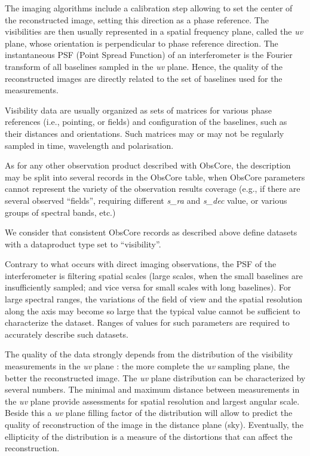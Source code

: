 \documentclass[11pt,a4paper]{ivoa}
\begin{document}
The imaging algorithms include a calibration step allowing to set the center of the
reconstructed image, setting this direction as a phase reference. The visibilities
are then usually represented in a spatial frequency plane, called the \emph{uv} plane,
whose orientation is perpendicular to phase reference direction. The instantaneous PSF
(Point Spread Function) of an interferometer is the Fourier transform of all baselines
sampled in the \emph{uv} plane. Hence, the quality of the reconstructed images are
directly related to the set of baselines used for the measurements.

Visibility data are usually organized as sets of matrices for various phase references
(i.e., pointing, or fields) and configuration of the baselines, such as their
distances and orientations. Such matrices may or may not be regularly sampled in time,
wavelength and polarisation.

As for any other observation product described with ObsCore, the description may be split into
several records in the ObsCore table, when ObsCore parameters cannot represent the
variety of the observation results coverage (e.g., if there are several observed ``fields'',
requiring different \emph{s\_ra} and \emph{s\_dec} value, or various groups of spectral bands, etc.)

We consider that consistent ObsCore records as described above define datasets with
a dataproduct type set to ``visibility''.

Contrary to what occurs with direct imaging observations, the PSF of the interferometer
is filtering spatial scales (large scales, when the small baselines are insufficiently
sampled; and vice versa for small scales with long baselines).
For large spectral ranges, the variations of the field of view and the spatial resolution
along the axis may become so large that the typical value cannot be sufficient to
characterize the dataset. Ranges of values for such parameters are required to accurately
describe such datasets.

The quality of the data strongly depends from the distribution of the visibility measurements
in the \emph{uv} plane : the more complete the \emph{uv} sampling plane, the better the reconstructed image.
The \emph{uv} plane distribution can be characterized by several numbers.
The minimal and maximum distance between measurements in the \emph{uv} plane provide assessments for
spatial resolution and largest angular scale.
Beside this a \emph{uv} plane filling factor of the distribution will allow to predict the quality
of reconstruction of the image in the distance plane (sky).
Eventually, the ellipticity of the distribution is a measure of the distortions that can
affect the reconstruction.
\end{document}
